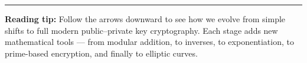 \documentclass[12pt]{article}
\begin{document}
\vspace{1em}
\hrule
\vspace{0.6em}

\textbf{Reading tip:} Follow the arrows downward to see how we evolve from simple shifts to full modern public–private key cryptography.  
Each stage adds new mathematical tools — from modular addition, to inverses, to exponentiation, to prime-based encryption, and finally to elliptic curves.
\end{document}
